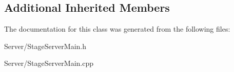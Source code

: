 \subsection*{Additional Inherited Members}


The documentation for this class was generated from the following files\-:\begin{DoxyCompactItemize}
\item 
Server/Stage\-Server\-Main.\-h\item 
Server/Stage\-Server\-Main.\-cpp\end{DoxyCompactItemize}
